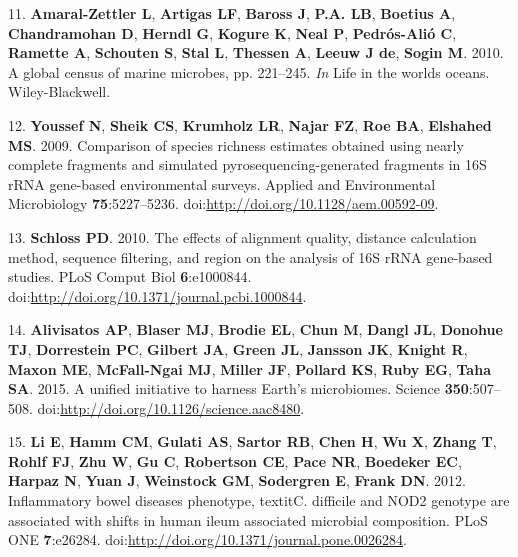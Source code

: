 \documentclass[11pt,]{article}
\begin{document}
11. \textbf{Amaral-Zettler L}, \textbf{Artigas LF}, \textbf{Baross J},
\textbf{P.A. LB}, \textbf{Boetius A}, \textbf{Chandramohan D},
\textbf{Herndl G}, \textbf{Kogure K}, \textbf{Neal P},
\textbf{Pedrós-Alió C}, \textbf{Ramette A}, \textbf{Schouten S},
\textbf{Stal L}, \textbf{Thessen A}, \textbf{Leeuw J de}, \textbf{Sogin
M}. 2010. A global census of marine microbes, pp. 221--245. \emph{In}
Life in the worlds oceans. Wiley-Blackwell.

12. \textbf{Youssef N}, \textbf{Sheik CS}, \textbf{Krumholz LR},
\textbf{Najar FZ}, \textbf{Roe BA}, \textbf{Elshahed MS}. 2009.
Comparison of species richness estimates obtained using nearly complete
fragments and simulated pyrosequencing-generated fragments in 16S rRNA
gene-based environmental surveys. Applied and Environmental Microbiology
\textbf{75}:5227--5236. doi:\url{http://doi.org/10.1128/aem.00592-09}.

13. \textbf{Schloss PD}. 2010. The effects of alignment quality,
distance calculation method, sequence filtering, and region on the
analysis of 16S rRNA gene-based studies. PLoS Comput Biol
\textbf{6}:e1000844.
doi:\url{http://doi.org/10.1371/journal.pcbi.1000844}.

14. \textbf{Alivisatos AP}, \textbf{Blaser MJ}, \textbf{Brodie EL},
\textbf{Chun M}, \textbf{Dangl JL}, \textbf{Donohue TJ},
\textbf{Dorrestein PC}, \textbf{Gilbert JA}, \textbf{Green JL},
\textbf{Jansson JK}, \textbf{Knight R}, \textbf{Maxon ME},
\textbf{McFall-Ngai MJ}, \textbf{Miller JF}, \textbf{Pollard KS},
\textbf{Ruby EG}, \textbf{Taha SA}. 2015. A unified initiative to
harness Earth's microbiomes. Science \textbf{350}:507--508.
doi:\url{http://doi.org/10.1126/science.aac8480}.

15. \textbf{Li E}, \textbf{Hamm CM}, \textbf{Gulati AS}, \textbf{Sartor
RB}, \textbf{Chen H}, \textbf{Wu X}, \textbf{Zhang T}, \textbf{Rohlf
FJ}, \textbf{Zhu W}, \textbf{Gu C}, \textbf{Robertson CE}, \textbf{Pace
NR}, \textbf{Boedeker EC}, \textbf{Harpaz N}, \textbf{Yuan J},
\textbf{Weinstock GM}, \textbf{Sodergren E}, \textbf{Frank DN}. 2012.
Inflammatory bowel diseases phenotype, textitC. difficile and NOD2
genotype are associated with shifts in human ileum associated microbial
composition. PLoS ONE \textbf{7}:e26284.
doi:\url{http://doi.org/10.1371/journal.pone.0026284}.
\end{document}
